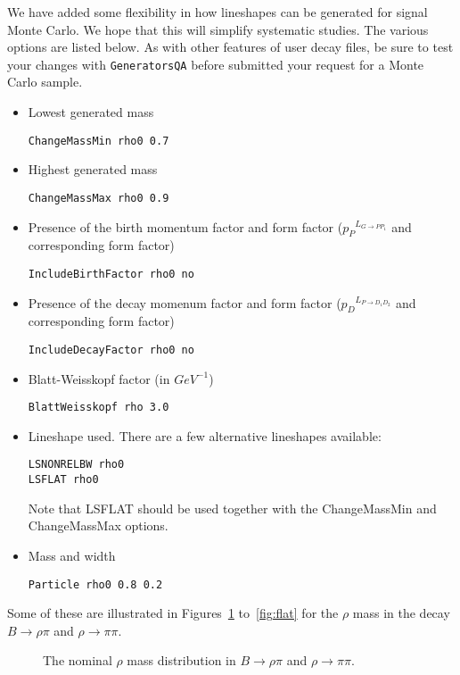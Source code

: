 We have added some flexibility in how lineshapes
can be generated for signal Monte Carlo.  We hope
that this will simplify systematic studies.  The
various options are listed below.  As with other
features of user decay files, be sure to test your
changes with {\tt GeneratorsQA} before submitted your
request for a Monte Carlo sample.  
\begin{itemize}
\item Lowest generated mass
\begin{verbatim}
ChangeMassMin rho0 0.7
\end{verbatim}
\item Highest generated mass
\begin{verbatim}
ChangeMassMax rho0 0.9
\end{verbatim}
\item Presence of the birth momentum factor and form factor
(${p_P}^{L_{G \to P P_1}}$ and corresponding form factor)
\begin{verbatim}
IncludeBirthFactor rho0 no
\end{verbatim}
\item Presence of the decay momenum factor and form factor
(${p_D}^{L_{P \to D_1 D_2}}$ and corresponding form factor)
\begin{verbatim}
IncludeDecayFactor rho0 no
\end{verbatim}
\item Blatt-Weisskopf factor (in $GeV^{-1}$)
\begin{verbatim}
BlattWeisskopf rho 3.0
\end{verbatim}
\item Lineshape used.  There are a few alternative
lineshapes available:
\begin{verbatim}
LSNONRELBW rho0
LSFLAT rho0
\end{verbatim}
Note that LSFLAT should be used together with the ChangeMassMin
and ChangeMassMax options.
\item Mass and width
\begin{verbatim}
Particle rho0 0.8 0.2
\end{verbatim}
\end{itemize}

Some of these are illustrated in Figures~\ref{fig:nom}
to~\ref{fig:flat} for the $\rho$ mass in the decay $B \to \rho \pi$ and $\rho
\to \pi \pi$.

\begin{figure}
\caption{The nominal $\rho$ mass distribution in 
$B \to \rho \pi$ and $\rho \to \pi \pi$.}
\label{fig:nom}
\end{figure}

